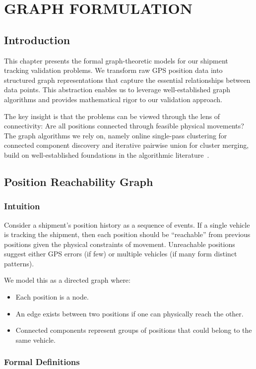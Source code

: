 \chapter{GRAPH FORMULATION}

\section{Introduction}
This chapter presents the formal graph-theoretic models for our shipment tracking validation problems. We transform raw GPS position data into structured graph representations that capture the essential relationships between data points. This abstraction enables us to leverage well-established graph algorithms and provides mathematical rigor to our validation approach.

The key insight is that the problems can be viewed through the lens of connectivity: Are all positions connected through feasible physical movements? The graph algorithms we rely on, namely online single-pass clustering for connected component discovery and iterative pairwise union for cluster merging, build on well-established foundations in the algorithmic literature~\cite{cormen2022introduction}.

\section{Position Reachability Graph}

\subsection{Intuition}
Consider a shipment's position history as a sequence of events. If a single vehicle is tracking the shipment, then each position should be ``reachable'' from previous positions given the physical constraints of movement. Unreachable positions suggest either GPS errors (if few) or multiple vehicles (if many form distinct patterns).

We model this as a directed graph where:
\begin{itemize}
    \item Each position is a node.
    \item An edge exists between two positions if one can physically reach the other.
    \item Connected components represent groups of positions that could belong to the same vehicle.
\end{itemize}

\subsection{Formal Definitions}

